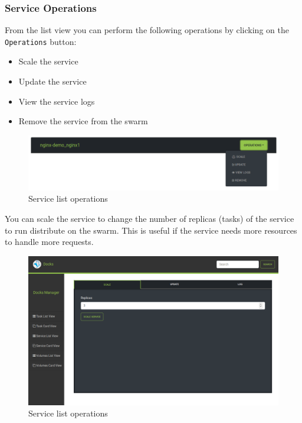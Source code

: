 \documentclass[]{article}
\providecommand{\tightlist}{%
	\setlength{\itemsep}{0pt}\setlength{\parskip}{0pt}}
\let\oldtexttt\texttt
\renewcommand{\texttt}[1]{
	\colorbox{Light}{\oldtexttt{#1}}
}
\begin{document}
\subsubsection{Service Operations}
From the list view you can perform the following operations by clicking on the \texttt{Operations} button:
\begin{itemize}
	\tightlist
	\item Scale the service
	\item Update the service
	\item View the service logs
	\item Remove the service from the swarm
\end{itemize}

\begin{figure}[H]
	\centering
	\includegraphics[scale=0.4]{service_list_operations.png}
	\caption{Service list operations}
\end{figure}

You can scale the service to change the number of replicas (tasks) of the service to run distribute on the swarm.
This is useful if the service needs more resources to handle more requests.

\begin{figure}[H]
	\centering
	\includegraphics[scale=0.4]{service_list_scale.png}
	\caption{Service list operations}
\end{figure}
\end{document}
